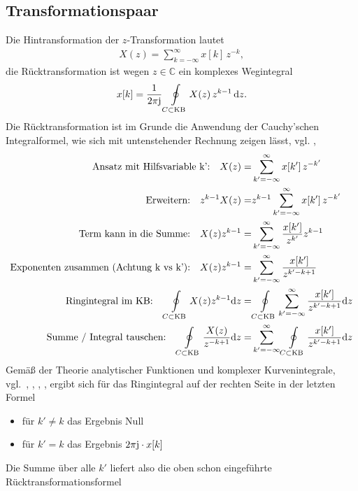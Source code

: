 \subsection*{Transformationspaar}
Die Hintransformation der $z$-Transformation lautet
\begin{align}
X(z) = \sum_{k=-\infty}^{\infty} x[k] \, z^{-k},
\end{align}
die Rücktransformation ist wegen $z\in\mathbb{C}$ ein komplexes Wegintegral
\begin{align}
x[k] = \frac{1}{2\pi \im} \oint\limits_{C \subset \text{KB}} X(z) \, z^{k-1} \, \fsd z.
\end{align}
%
Die Rücktransformation ist im Grunde die Anwendung der Cauchy’schen Integralformel,
wie sich mit untenstehender Rechnung zeigen lässt, vgl.
\cite[S.\,152]{Wunsch1972}, \cite[S.\,180ff]{Wunsch2006a}
\begin{align}
\text{Ansatz mit Hilfsvariable k':} \quad X(z) =& \sum_{k'=-\infty}^{\infty} x[k'] \, z^{-k'}\\
\text{Erweitern:} \quad z^{k-1} X(z) =& z^{k-1} \sum_{k'=-\infty}^{\infty} x[k'] \, z^{-k'}\\
\text{Term kann in die Summe:} \quad X(z) z^{k-1} =& \sum_{k'=-\infty}^{\infty} \frac{x[k']}{z^{k'}} z^{k-1}\\
\text{Exponenten zusammen (Achtung k vs k'):} \quad X(z) z^{k-1} =& \sum_{k'=-\infty}^{\infty} \frac{x[k']}{z^{k'-k+1}}\\
\text{Ringintegral im KB:} \quad \oint\limits_{C \subset \text{KB}} X(z) z^{k-1} \mathrm{d} z =&
\oint\limits_{C \subset \text{KB}}
\sum_{k'=-\infty}^{\infty} \frac{x[k']}{z^{k'-k+1}} \mathrm{d} z\\
\text{Summe / Integral tauschen:} \quad
\oint\limits_{C \subset \text{KB}} \frac{X(z)}{z^{-k+1}} \mathrm{d} z =&
\sum_{k'=-\infty}^{\infty}
\oint\limits_{C \subset \text{KB}}
\frac{x[k']}{z^{k'-k+1}} \mathrm{d} z
\end{align}
Gemäß der Theorie analytischer Funktionen und komplexer Kurvenintegrale, vgl.~\cite[Kap.\,5]{Strang2007,Strang2010}, \cite[Kap. 11]{Arfken2013}, \cite[Kap. 32]{Arens2022}, \cite[Kap.\,2]{Burg2013b},
ergibt sich für das Ringintegral auf der rechten Seite in der letzten Formel
\begin{itemize}
  \item für $k' \neq k$ das Ergebnis Null
  \item für $k' = k$ das Ergebnis $2\pi \im \cdot x[k]$
\end{itemize}
Die Summe über alle $k'$ liefert also die oben schon eingeführte Rücktransformationsformel
